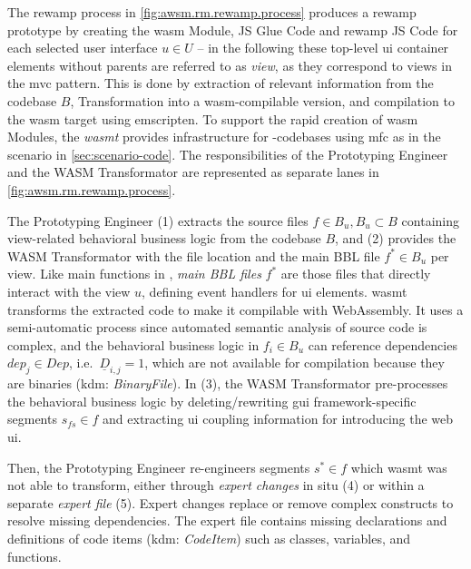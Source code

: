 The \gls{rewamp} process \autocite{Heil2018ReWaMP} in \cref{fig:awsm.rm.rewamp.process} produces a \gls{rewamp} prototype by creating the \gls{wasm} Module, JS Glue Code and \gls{rewamp} JS Code for each selected user interface \(u\in U\) -- in the following these top-level \gls{ui} container elements without parents are referred to as \emph{view}, as they correspond to views in the \gls{mvc} pattern.
This is done by extraction of relevant information from the  codebase \(B\), \gls{Transformation} into a \gls{wasm}-compilable version, and compilation to the \gls{wasm} target using emscripten.
To support the rapid creation of \gls{wasm} Modules, the \emph{\gls{wasmt}} provides infrastructure for \cpp -codebases using \gls{mfc} as in the scenario in \cref{sec:scenario-code}.
The responsibilities of the Prototyping Engineer and the WASM Transformator are represented as separate lanes in \cref{fig:awsm.rm.rewamp.process}.

The Prototyping Engineer (1) extracts the source files \(f \in B_u, B_u \subset B\) containing view-related behavioral business logic from the  codebase \(B\), and (2) provides the WASM Transformator with the file location and the main BBL file \(f^* \in B_u\) per view.
Like main functions in \cpp, \emph{main BBL files} \(f^*\) are those files that directly interact with the view \(u\), defining event handlers for \gls{ui} elements.
\gls{wasmt} transforms the extracted  code to make it compilable with WebAssembly.
It uses a semi-automatic process since automated semantic analysis of source code is complex, and the behavioral business logic in \(f_i \in B_u\) can reference dependencies \(dep_j \in Dep\), i.e.~\(\underline D_{i,j} = 1\), which are not available for compilation because they are binaries (\gls{kdm}: \emph{BinaryFile}).
In (3), the WASM Transformator pre-processes the behavioral business logic by deleting/rewriting \gls{gui} framework-specific segments \(s_{fs} \in f \) and extracting \gls{ui} coupling information for introducing the \gls{web} \gls{ui}.

Then, the Prototyping Engineer re-engineers segments \(s^* \in f\) which \gls{wasmt} was not able to transform, either through \emph{expert changes} in situ (4) or within a separate \emph{expert file} (5).
Expert changes replace or remove complex constructs to resolve missing dependencies.
The expert file contains missing declarations and definitions of code items (\gls{kdm}: \emph{CodeItem}) such as classes, variables, and functions.

